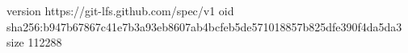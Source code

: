 version https://git-lfs.github.com/spec/v1
oid sha256:b947b67867c41e7b3a93eb8607ab4bcfeb5de571018857b825dfe390f4da5da3
size 112288
